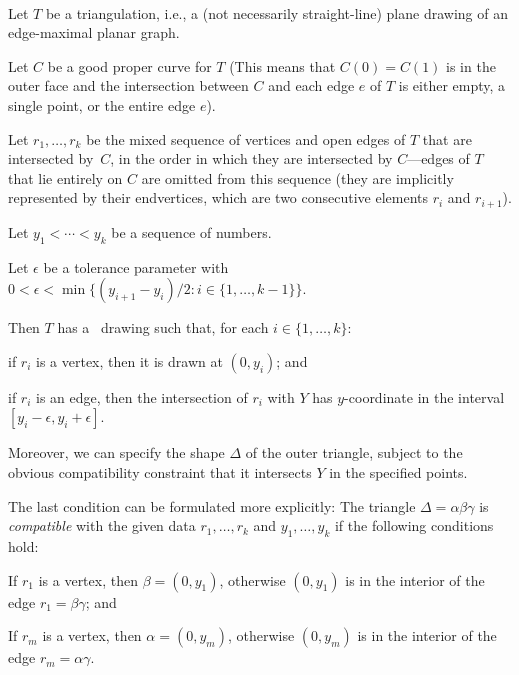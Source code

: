 \begin{thm}\ \newline
  \begin{compactitem}
    \item Let $T$ be a triangulation, i.e.,
      a (not necessarily straight-line) plane drawing of an edge-maximal
      planar graph.
    \item Let $C$ be a good proper curve for $T$ (This means that $C(0)=C(1)$
      is in the outer face and the intersection between $C$ and each edge
      $e$ of $T$ is either empty, a single point, or the entire edge $e$).
     \item Let $r_1,\ldots,r_k$ be the mixed sequence of vertices and open edges of $T$ that are intersected by~$C$, in the order in which they are intersected by $C$---edges of $T$ that lie entirely on $C$ are omitted from this sequence (they are implicitly represented by their endvertices, which are two consecutive elements $r_i$ and $r_{i+1}$).
	\item Let $y_1<\cdots<y_k$ be a sequence of numbers.
                  
       \item Let $\epsilon$ be a tolerance parameter with $0<\epsilon<\min\{(y_{i+1}-y_i)/2:i\in\{1,\ldots,k-1\}\}$.
\end{compactitem}
Then
        $T$
        has a \Fary\ drawing such that,
	for each $i\in\{1,\ldots,k\}$: 
	\begin{compactitem}%
		\item if $r_i$ is a vertex, then it is drawn at $(0,y_i)$; and
		\item if $r_i$ is an edge, then the intersection of $r_i$ with $Y$ has $y$-coordinate in the interval $[y_i-\epsilon,y_i+\epsilon]$.
\end{compactitem}

Moreover, we can specify the shape $\Delta$ of the outer triangle,
subject to the
obvious compatibility constraint that it intersects $Y$ in the specified points.
                
\end{thm}
The last condition can be formulated more explicitly:
The triangle $\Delta=\alpha\beta\gamma$ is \emph{compatible} with the
given data $r_1,\ldots,r_k$ and $y_1,\ldots,y_k$ if the following conditions hold:
\begin{compactitem}
	\item If $r_1$ is a vertex, then $\beta=(0,y_1)$, otherwise $(0, y_1)$ is in the interior of the edge $r_1=\beta\gamma$; and
	\item If $r_m$ is a vertex, then $\alpha=(0,y_m)$, otherwise $(0,y_m)$ is in the interior
	of the edge $r_m=\alpha\gamma$.
\end{compactitem}

